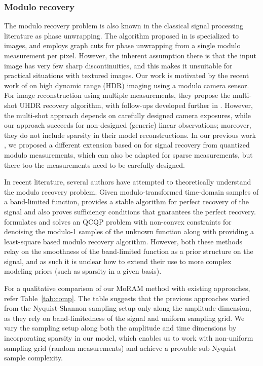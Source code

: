 \subsubsection*{Modulo recovery} The modulo recovery problem is also known in the classical signal processing literature
as phase unwrapping. The algorithm proposed in \cite{bioucas2007phase} is specialized to images, and employs graph cuts for phase unwrapping from a single modulo measurement per pixel. However, the inherent assumption there is that the input image has very few sharp discontinuities, and this makes it unsuitable for practical situations with textured images. Our work is motivated by the recent work of \cite{ICCP15_Zhao} on high dynamic range (HDR) imaging using a modulo camera sensor. For image reconstruction using multiple measurements, they propose the multi-shot UHDR recovery algorithm, with follow-ups developed further in \cite{Lang2017}. However, the multi-shot approach depends on carefully designed camera exposures, while our approach succeeds for non-designed (generic) linear observations; moreover, they do not include sparsity in their model reconstructions. In our previous work \cite{Shah}, we proposed a different extension based on \cite{ICCP15_Zhao, soltani2017stable} for signal recovery from quantized modulo measurements, which can also be adapted for sparse measurements, but there too the measurements need to be carefully designed.

In recent literature, several authors have attempted to theoretically understand the modulo recovery problem. Given modulo-transformed time-domain samples of a band-limited function, \cite{Bhandari} provides a stable algorithm for perfect recovery of the signal and also proves sufficiency conditions that guarantees the perfect recovery. \cite{Cucuringu2017} formulates and solves an QCQP problem with non-convex constraints for denoising the modulo-1 samples of the unknown function along with providing a least-square based modulo recovery algorithm. However, both these methods relay on the smoothness of the band-limited function as a prior structure on the signal, and as such it is unclear how to extend their use to more complex modeling priors (such as sparsity in a given basis). 

For a qualitative comparison of our MoRAM method with existing approaches, refer Table~\ref{tab:comp}. The table suggests that the previous approaches varied from the Nyquist-Shannon sampling setup only along the amplitude dimension, as they rely on band-limitedness of the signal and uniform sampling grid. We vary the sampling setup along both the amplitude and time dimensions by incorporating sparsity in our model, which enables us to work with non-uniform sampling grid (random measurements) and achieve a provable sub-Nyquist sample complexity.

